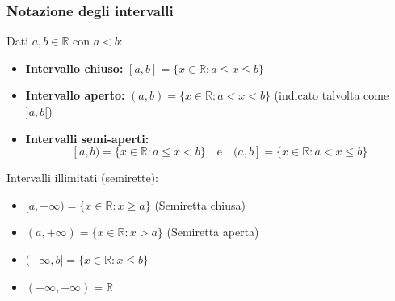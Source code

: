 \subsubsection{Notazione degli intervalli}
Dati $a, b \in \mathbb{R}$ con $a < b$: 
\begin{itemize}
    \item \textbf{Intervallo chiuso:} $[a, b] = \{ x \in \mathbb{R} : a \le x \le b \}$ 
    \item \textbf{Intervallo aperto:} $(a, b) = \{ x \in \mathbb{R} : a < x < b \}$ (indicato talvolta come $]a, b[$) 
    \item \textbf{Intervalli semi-aperti:} 
    $$ [a, b) = \{ x \in \mathbb{R} : a \le x < b \} \quad \text{e} \quad (a, b] = \{ x \in \mathbb{R} : a < x \le b \} $$
\end{itemize}

Intervalli illimitati (semirette): 
\begin{itemize}
    \item $[a, +\infty) = \{ x \in \mathbb{R} : x \ge a \}$ (Semiretta chiusa)
    \item $(a, +\infty) = \{ x \in \mathbb{R} : x > a \}$ (Semiretta aperta)
    \item $(-\infty, b] = \{ x \in \mathbb{R} : x \le b \}$
    \item $(-\infty, +\infty) = \mathbb{R}$ 
\end{itemize}
